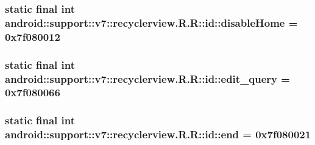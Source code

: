 \hypertarget{classandroid_1_1support_1_1v7_1_1recyclerview_1_1_r_1_1id_2ed6e5d1d5480a69fc95a984bef7e112}{
\subsubsection[{disableHome}]{\setlength{\rightskip}{0pt plus 5cm}static final int android::support::v7::recyclerview.R.R::id::disableHome = 0x7f080012}}
\label{classandroid_1_1support_1_1v7_1_1recyclerview_1_1_r_1_1id_2ed6e5d1d5480a69fc95a984bef7e112}


\hypertarget{classandroid_1_1support_1_1v7_1_1recyclerview_1_1_r_1_1id_03d01297b97f369f1bb776d2da947e9e}{
\subsubsection[{edit\_\-query}]{\setlength{\rightskip}{0pt plus 5cm}static final int android::support::v7::recyclerview.R.R::id::edit\_\-query = 0x7f080066}}
\label{classandroid_1_1support_1_1v7_1_1recyclerview_1_1_r_1_1id_03d01297b97f369f1bb776d2da947e9e}


\hypertarget{classandroid_1_1support_1_1v7_1_1recyclerview_1_1_r_1_1id_3b03985a128e11283727a8360991b40a}{
\subsubsection[{end}]{\setlength{\rightskip}{0pt plus 5cm}static final int android::support::v7::recyclerview.R.R::id::end = 0x7f080021}}
\label{classandroid_1_1support_1_1v7_1_1recyclerview_1_1_r_1_1id_3b03985a128e11283727a8360991b40a}


